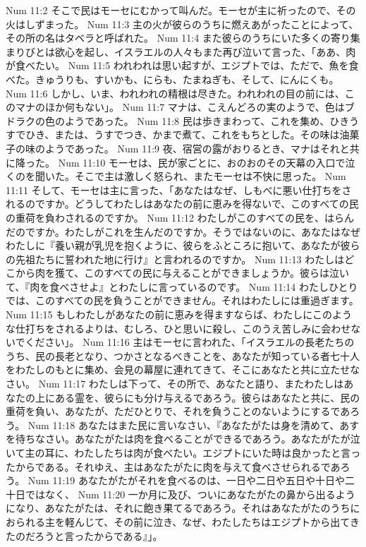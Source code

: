 Num 11:2  そこで民はモーセにむかって叫んだ。モーセが主に祈ったので、その火はしずまった。
Num 11:3  主の火が彼らのうちに燃えあがったことによって、その所の名はタベラと呼ばれた。
Num 11:4  また彼らのうちにいた多くの寄り集まりびとは欲心を起し、イスラエルの人々もまた再び泣いて言った、「ああ、肉が食べたい。
Num 11:5  われわれは思い起すが、エジプトでは、ただで、魚を食べた。きゅうりも、すいかも、にらも、たまねぎも、そして、にんにくも。
Num 11:6  しかし、いま、われわれの精根は尽きた。われわれの目の前には、このマナのほか何もない」。
Num 11:7  マナは、こえんどろの実のようで、色はブドラクの色のようであった。
Num 11:8  民は歩きまわって、これを集め、ひきうすでひき、または、うすでつき、かまで煮て、これをもちとした。その味は油菓子の味のようであった。
Num 11:9  夜、宿営の露がおりるとき、マナはそれと共に降った。
Num 11:10  モーセは、民が家ごとに、おのおのその天幕の入口で泣くのを聞いた。そこで主は激しく怒られ、またモーセは不快に思った。
Num 11:11  そして、モーセは主に言った、「あなたはなぜ、しもべに悪い仕打ちをされるのですか。どうしてわたしはあなたの前に恵みを得ないで、このすべての民の重荷を負わされるのですか。
Num 11:12  わたしがこのすべての民を、はらんだのですか。わたしがこれを生んだのですか。そうではないのに、あなたはなぜわたしに『養い親が乳児を抱くように、彼らをふところに抱いて、あなたが彼らの先祖たちに誓われた地に行け』と言われるのですか。
Num 11:13  わたしはどこから肉を獲て、このすべての民に与えることができましょうか。彼らは泣いて、『肉を食べさせよ』とわたしに言っているのです。
Num 11:14  わたしひとりでは、このすべての民を負うことができません。それはわたしには重過ぎます。
Num 11:15  もしわたしがあなたの前に恵みを得ますならば、わたしにこのような仕打ちをされるよりは、むしろ、ひと思いに殺し、このうえ苦しみに会わせないでください」。
Num 11:16  主はモーセに言われた、「イスラエルの長老たちのうち、民の長老となり、つかさとなるべきことを、あなたが知っている者七十人をわたしのもとに集め、会見の幕屋に連れてきて、そこにあなたと共に立たせなさい。
Num 11:17  わたしは下って、その所で、あなたと語り、またわたしはあなたの上にある霊を、彼らにも分け与えるであろう。彼らはあなたと共に、民の重荷を負い、あなたが、ただひとりで、それを負うことのないようにするであろう。
Num 11:18  あなたはまた民に言いなさい、『あなたがたは身を清めて、あすを待ちなさい。あなたがたは肉を食べることができるであろう。あなたがたが泣いて主の耳に、わたしたちは肉が食べたい。エジプトにいた時は良かったと言ったからである。それゆえ、主はあなたがたに肉を与えて食べさせられるであろう。
Num 11:19  あなたがたがそれを食べるのは、一日や二日や五日や十日や二十日ではなく、
Num 11:20  一か月に及び、ついにあなたがたの鼻から出るようになり、あなたがたは、それに飽き果てるであろう。それはあなたがたのうちにおられる主を軽んじて、その前に泣き、なぜ、わたしたちはエジプトから出てきたのだろうと言ったからである』」。
